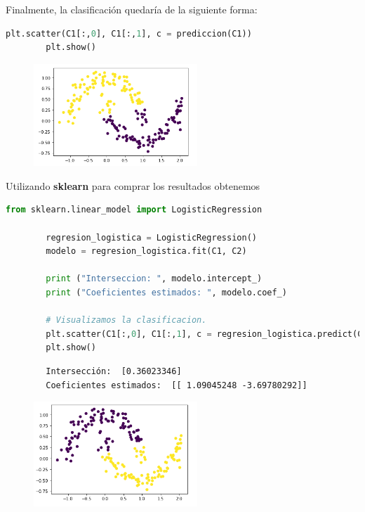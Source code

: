 \documentclass[letterpaper,11pt]{article}
\begin{document}
\begin{enumerate}
\begin{enumerate}
        \newpage
        Finalmente, la clasificación quedaría de la siguiente forma:
        \begin{lstlisting}[language=Python]
        plt.scatter(C1[:,0], C1[:,1], c = prediccion(C1))
        plt.show()
        \end{lstlisting}

        \begin{figure}[ht]
            \centering
            \includegraphics[width=0.55\textwidth]{./imagenes/clasificacion.png}
        \end{figure} 

        Utilizando \textbf{sklearn} para comprar los resultados obtenemos
        \begin{lstlisting}[language=Python]
        from sklearn.linear_model import LogisticRegression

        regresion_logistica = LogisticRegression()
        modelo = regresion_logistica.fit(C1, C2)

        print ("Interseccion: ", modelo.intercept_)
        print ("Coeficientes estimados: ", modelo.coef_)

        # Visualizamos la clasificacion.
        plt.scatter(C1[:,0], C1[:,1], c = regresion_logistica.predict(C1))
        plt.show()
        \end{lstlisting}

        \begin{verbatim}
        Intersección:  [0.36023346]
        Coeficientes estimados:  [[ 1.09045248 -3.69780292]]
        \end{verbatim}

        \begin{figure}[h]
            \centering
            \includegraphics[width=0.55\textwidth]{./imagenes/revision.png}
        \end{figure} 


\end{enumerate}
\end{enumerate}
\end{document}
